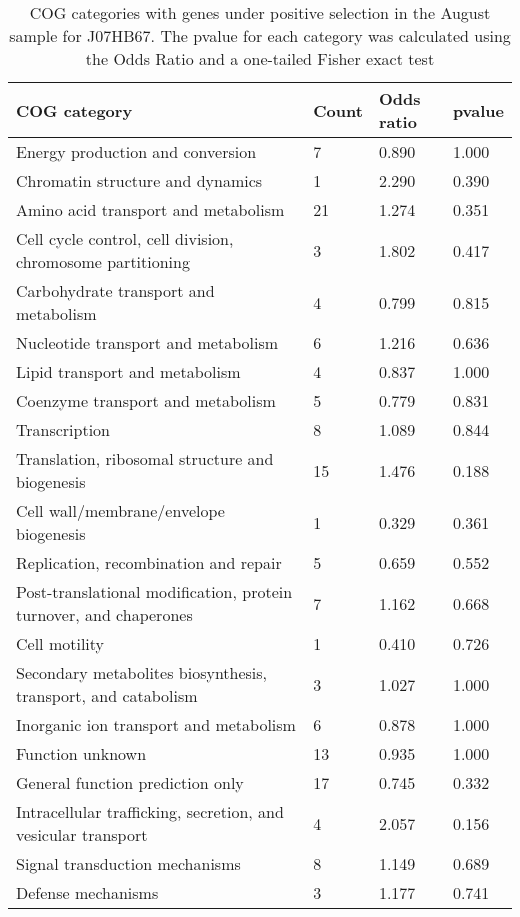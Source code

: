 \begin{table}[hb]
\footnotesize 
	\tabcolsep=0.11cm 
\caption{COG categories with genes under positive selection in the August sample for J07HB67. The pvalue for each category was calculated using the Odds Ratio and a one-tailed Fisher exact test \\} 
\begin{tabularx}{\textwidth}{L{6cm}R{2cm}R{2cm}R{2cm}} 
\hline 
\textbf{COG category} & \textbf{Count} & \textbf{Odds ratio} & \textbf{pvalue} \\ 
\hline 
Energy production and conversion & 7 & 0.890 & 1.000 \\ 
Chromatin structure and dynamics & 1 & 2.290 & 0.390 \\ 
Amino acid transport and metabolism & 21 & 1.274 & 0.351 \\ 
Cell cycle control, cell division, chromosome partitioning & 3 & 1.802 & 0.417 \\ 
Carbohydrate transport and metabolism & 4 & 0.799 & 0.815 \\ 
Nucleotide transport and metabolism & 6 & 1.216 & 0.636 \\ 
Lipid transport and metabolism & 4 & 0.837 & 1.000 \\ 
Coenzyme transport and metabolism & 5 & 0.779 & 0.831 \\ 
Transcription & 8 & 1.089 & 0.844 \\ 
Translation, ribosomal structure and biogenesis & 15 & 1.476 & 0.188 \\ 
Cell wall/membrane/envelope biogenesis & 1 & 0.329 & 0.361 \\ 
Replication, recombination and repair & 5 & 0.659 & 0.552 \\ 
Post-translational modification, protein turnover, and chaperones & 7 & 1.162 & 0.668 \\ 
Cell motility & 1 & 0.410 & 0.726 \\ 
Secondary metabolites biosynthesis, transport, and catabolism & 3 & 1.027 & 1.000 \\ 
Inorganic ion transport and metabolism & 6 & 0.878 & 1.000 \\ 
Function unknown & 13 & 0.935 & 1.000 \\ 
General function prediction only & 17 & 0.745 & 0.332 \\ 
Intracellular trafficking, secretion, and vesicular transport & 4 & 2.057 & 0.156 \\ 
Signal transduction mechanisms & 8 & 1.149 & 0.689 \\ 
Defense mechanisms & 3 & 1.177 & 0.741 \\ 
\end{tabularx} 
\label{August_COG_Selection_J07HB67} 
 \end{table} 

